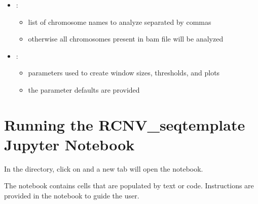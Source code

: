 \documentclass[letterpaper,10pt,english]{sphinxhowto}
\begin{document}
\begin{sphinxVerbatim}[commandchars=\\\{\}]
     
     
     
     
\end{sphinxVerbatim}
\begin{itemize}
\item {} 
:
\begin{itemize}
\item {} 
list of chromosome names to analyze separated by commas

\item {} 
otherwise all chromosomes present in bam file will be analyzed

\end{itemize}

\item {} 
:
\begin{itemize}
\item {} 
parameters used to create window sizes, thresholds, and plots

\item {} 
the parameter defaults are provided

\end{itemize}

\end{itemize}


\section{Running the RCNV\_seq\sphinxhyphen{}template Jupyter Notebook}
\label{\detokenize{index:running-the-rcnv-seq-template-jupyter-notebook}}
In the  directory, click on  and a new tab will open the notebook.

The notebook contains cells that are populated by text or code. Instructions are provided in the notebook to guide the user.
\end{document}
